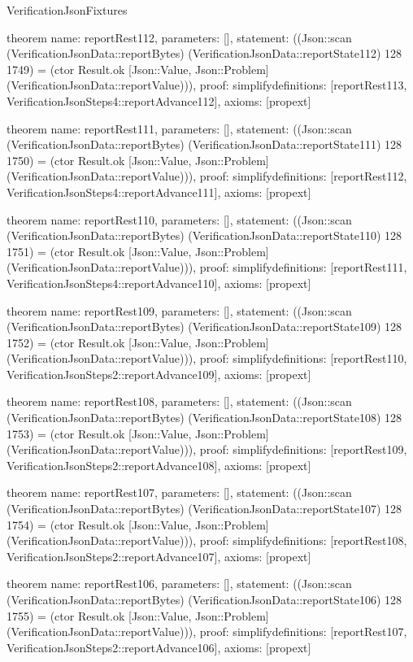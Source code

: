 \begin{lexlean}{VerificationJsonFixtures}
\begin{semanticmodule}
theorem{
  name: reportRest112,
  parameters: [],
  statement: ((Json::scan (VerificationJsonData::reportBytes) (VerificationJsonData::reportState112) 128 1749) = (ctor Result.ok [Json::Value, Json::Problem] (VerificationJsonData::reportValue))),
  proof: simplify{definitions: [reportRest113, VerificationJsonSteps4::reportAdvance112]},
  axioms: [propext]
}

theorem{
  name: reportRest111,
  parameters: [],
  statement: ((Json::scan (VerificationJsonData::reportBytes) (VerificationJsonData::reportState111) 128 1750) = (ctor Result.ok [Json::Value, Json::Problem] (VerificationJsonData::reportValue))),
  proof: simplify{definitions: [reportRest112, VerificationJsonSteps4::reportAdvance111]},
  axioms: [propext]
}

theorem{
  name: reportRest110,
  parameters: [],
  statement: ((Json::scan (VerificationJsonData::reportBytes) (VerificationJsonData::reportState110) 128 1751) = (ctor Result.ok [Json::Value, Json::Problem] (VerificationJsonData::reportValue))),
  proof: simplify{definitions: [reportRest111, VerificationJsonSteps4::reportAdvance110]},
  axioms: [propext]
}

theorem{
  name: reportRest109,
  parameters: [],
  statement: ((Json::scan (VerificationJsonData::reportBytes) (VerificationJsonData::reportState109) 128 1752) = (ctor Result.ok [Json::Value, Json::Problem] (VerificationJsonData::reportValue))),
  proof: simplify{definitions: [reportRest110, VerificationJsonSteps2::reportAdvance109]},
  axioms: [propext]
}

theorem{
  name: reportRest108,
  parameters: [],
  statement: ((Json::scan (VerificationJsonData::reportBytes) (VerificationJsonData::reportState108) 128 1753) = (ctor Result.ok [Json::Value, Json::Problem] (VerificationJsonData::reportValue))),
  proof: simplify{definitions: [reportRest109, VerificationJsonSteps2::reportAdvance108]},
  axioms: [propext]
}

theorem{
  name: reportRest107,
  parameters: [],
  statement: ((Json::scan (VerificationJsonData::reportBytes) (VerificationJsonData::reportState107) 128 1754) = (ctor Result.ok [Json::Value, Json::Problem] (VerificationJsonData::reportValue))),
  proof: simplify{definitions: [reportRest108, VerificationJsonSteps2::reportAdvance107]},
  axioms: [propext]
}

theorem{
  name: reportRest106,
  parameters: [],
  statement: ((Json::scan (VerificationJsonData::reportBytes) (VerificationJsonData::reportState106) 128 1755) = (ctor Result.ok [Json::Value, Json::Problem] (VerificationJsonData::reportValue))),
  proof: simplify{definitions: [reportRest107, VerificationJsonSteps2::reportAdvance106]},
  axioms: [propext]
}


\end{semanticmodule}
\end{lexlean}
